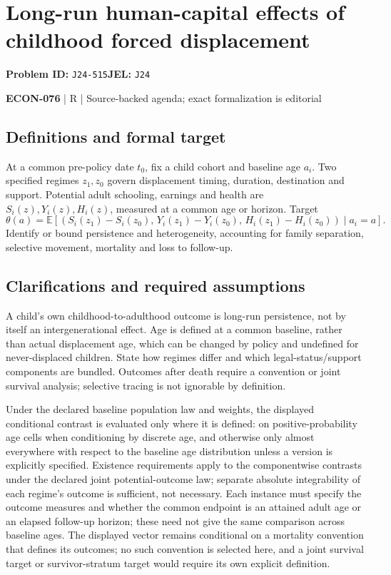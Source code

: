 \documentclass[11pt,a4paper]{article}
\begin{document}
\section*{Long-run human-capital effects of childhood forced displacement}
\textbf{Problem ID:} \texttt{J24-515}\quad \textbf{JEL:} \texttt{J24}\par
\label{problem:OP-0642}


\label{audited:ECON-076}

{\sffamily\small\color{muted}\textbf{ECON-076} | R | Source-backed agenda; exact formalization is editorial\par}

\subsection*{Definitions and formal target}

At a common pre-policy date \(t_0\), fix a child cohort and baseline age \(a_i\). Two specified regimes \(z_1,z_0\) govern displacement timing, duration, destination and support. Potential adult schooling, earnings and health are \(S_i(z),Y_i(z),H_i(z)\), measured at a common age or horizon. Target
\[
 \theta(a)=\mathbb E[(S_i(z_1)-S_i(z_0),\,Y_i(z_1)-Y_i(z_0),\,
                     H_i(z_1)-H_i(z_0))\mid a_i=a].
\]
Identify or bound persistence and heterogeneity, accounting for family separation, selective movement, mortality and loss to follow-up.

\subsection*{Clarifications and required assumptions}

A child's own childhood-to-adulthood outcome is long-run persistence, not by itself an intergenerational effect. Age is defined at a common baseline, rather than actual displacement age, which can be changed by policy and undefined for never-displaced children. State how regimes differ and which legal-status/support components are bundled. Outcomes after death require a convention or joint survival analysis; selective tracing is not ignorable by definition.

Under the declared baseline population law and weights, the displayed conditional contrast is evaluated only where it is defined: on positive-probability age cells when conditioning by discrete age, and otherwise only almost everywhere with respect to the baseline age distribution unless a version is explicitly specified. Existence requirements apply to the componentwise contrasts under the declared joint potential-outcome law; separate absolute integrability of each regime's outcome is sufficient, not necessary. Each instance must specify the outcome measures and whether the common endpoint is an attained adult age or an elapsed follow-up horizon; these need not give the same comparison across baseline ages. The displayed vector remains conditional on a mortality convention that defines its outcomes; no such convention is selected here, and a joint survival target or survivor-stratum target would require its own explicit definition.
\end{document}
